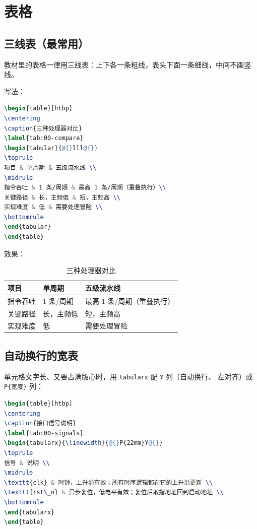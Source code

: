 \section{表格}
\label{sec:00-tables}

\subsection{三线表（最常用）}

教材里的表格一律用三线表：上下各一条粗线，表头下面一条细线，中间不画竖线。

写法：

\begin{lstlisting}[language=TeX]
\begin{table}[htbp]
\centering
\caption{三种处理器对比}
\label{tab:00-compare}
\begin{tabular}{@{}lll@{}}
\toprule
项目 & 单周期 & 五级流水线 \\
\midrule
指令吞吐 & 1 条/周期 & 最高 1 条/周期（重叠执行）\\
关键路径 & 长，主频低 & 短，主频高 \\
实现难度 & 低 & 需要处理冒险 \\
\bottomrule
\end{tabular}
\end{table}
\end{lstlisting}

效果：

\begin{table}[htbp]
\centering
\caption{三种处理器对比}
\label{tab:00-compare}
\begin{tabular}{@{}lll@{}}
\toprule
项目 & 单周期 & 五级流水线 \\
\midrule
指令吞吐 & 1 条/周期 & 最高 1 条/周期（重叠执行）\\
关键路径 & 长，主频低 & 短，主频高 \\
实现难度 & 低 & 需要处理冒险 \\
\bottomrule
\end{tabular}
\end{table}

\subsection{自动换行的宽表}

单元格文字长、又要占满版心时，用 \texttt{tabularx} 配 \texttt{Y} 列（自动换行、
左对齐）或 \texttt{P\{宽度\}} 列：

\begin{lstlisting}[language=TeX]
\begin{table}[htbp]
\centering
\caption{接口信号说明}
\label{tab:00-signals}
\begin{tabularx}{\linewidth}{@{}P{22mm}Y@{}}
\toprule
信号 & 说明 \\
\midrule
\texttt{clk} & 时钟，上升沿有效；所有时序逻辑都在它的上升沿更新 \\
\texttt{rst\_n} & 异步复位，低电平有效；复位后取指地址回到启动地址 \\
\bottomrule
\end{tabularx}
\end{table}
\end{lstlisting}

